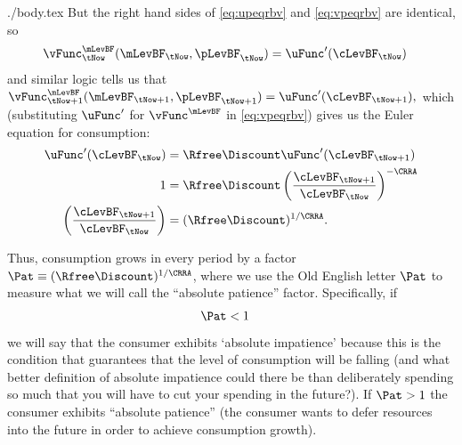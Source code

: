 \documentclass{handout}
\begin{document}
\begin{verbatimwrite}{./body.tex}
But the right hand sides of \eqref{eq:upeqrbv} and \eqref{eq:vpeqrbv} 
are identical, so
\begin{equation}\begin{gathered}\begin{aligned}
        \vFunc_{\tNow}^{\mLevBF}(\mLevBF_{\tNow},\pLevBF_{\tNow}) & =  \uFunc^{\prime}(\cLevBF_{\tNow})
\end{aligned}\end{gathered}\end{equation}
and similar logic tells us that $\vFunc_{\tNow+1}^{\mLevBF}(\mLevBF_{\tNow+1},\pLevBF_{\tNow+1})=\uFunc^{\prime}(\cLevBF_{\tNow+1}),$ which 
(substituting $\uFunc^{\prime}$ for $\vFunc^{\mLevBF}$ in \eqref{eq:vpeqrbv}) gives us the \hypertarget{EulerCGroFac}{Euler 
equation for consumption}:
\begin{equation}\begin{gathered}\begin{aligned}
        \uFunc^{\prime}(\cLevBF_{\tNow}) & =  \Rfree\Discount \uFunc^{\prime}(\cLevBF_{\tNow+1}) \\
        1 & =  \Rfree\Discount \left(\frac{\cLevBF_{\tNow+1}}{\cLevBF_{\tNow}}\right)^{-\CRRA}
\\  \left(\frac{\cLevBF_{\tNow+1}}{\cLevBF_{\tNow}}\right) & =  (\Rfree\Discount)^{1/\CRRA} \label{eq:cgrow}
.
\end{aligned}\end{gathered}\end{equation}

Thus, consumption grows in every period by a factor $\Pat \equiv (\Rfree\Discount)^{1/\CRRA}$, where we use the Old English letter $\Pat$ to measure what we will call the ``absolute patience'' factor.  Specifically, if 
\begin{equation}\begin{gathered}\begin{aligned}
     \Pat & <  1 \label{eq:AIC}
\end{aligned}\end{gathered}\end{equation}
we will say that the consumer exhibits `absolute impatience' because this is the condition that guarantees that the level of consumption will be falling (and what better definition of absolute impatience could there be than deliberately spending so much that you will have to cut your spending in the future?).  If $\Pat > 1$ the consumer exhibits ``absolute patience'' (the consumer wants to defer resources into the future in order to achieve consumption growth).


\end{verbatimwrite}
\end{document}

